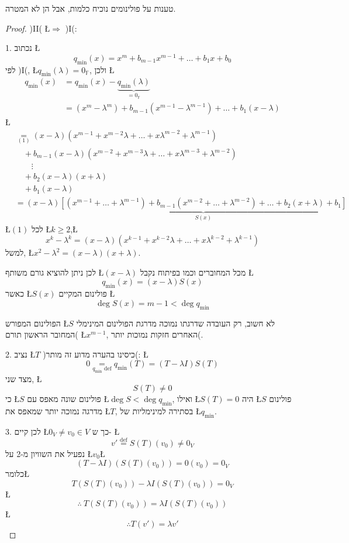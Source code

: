 \documentclass[english,hebrew]{article}
\begin{document}
טענות על פולינומים נוכיח כלמות, אבל הן לא המטרה.
\begin{proof}
)II( \L{$\Rightarrow$} )I(:

1. נכתוב \L{%
\[
q_{\min}(x)=x^{m}+b_{m-1}x^{m-1}+\dots+b_{1}x+b_{0}
\]
}%
לפי )I(, \L{$q_{\min}(\lambda)=0_{\mathbb{F}}$}, ולכן \L{%
\begin{align*}
q_{\min}(x) & =q_{\min}(x)-\underbrace{q_{\min}(\lambda)}_{=0_{\mathbb{F}}}\\
 & =\left(x^{m}-\lambda^{m}\right)+b_{m-1}\left(x^{m-1}-\lambda^{m-1}\right)+\dots+b_{1}\left(x-\lambda\right)
\end{align*}
}%
\L{%
\begin{align*}
 & \underset{(1)}{=}\left(x-\lambda\right)\left(x^{m-1}+x^{m-2}\lambda+\dots+x\lambda^{m-2}+\lambda^{m-1}\right)\\
 & \quad+b_{m-1}\left(x-\lambda\right)\left(x^{m-2}+x^{m-3}\lambda+\dots+x\lambda^{m-3}+\lambda^{m-2}\right)\\
 & \quad\quad\vdots\\
 & \quad+b_{2}\left(x-\lambda\right)\left(x+\lambda\right)\\
 & \quad+b_{1}\left(x-\lambda\right)\\
 & =\left(x-\lambda\right)\underset{S(x)}{\underbrace{\left[\left(x^{m-1}+\dots+\lambda^{m-1}\right)+b_{m-1}\left(x^{m-2}+\dots+\lambda^{m-2}\right)+\dots+b_{2}\left(x+\lambda\right)+b_{1}\right]}}
\end{align*}
}%
\L{$(1)$} לכל \L{$k\geq2$},\L{%
\[
x^{k}-\lambda^{k}=(x-\lambda)\left(x^{k-1}+x^{k-2}\lambda+\dots+x\lambda^{k-2}+\lambda^{k-1}\right)
\]
}%
למשל, \L{$x^{2}-\lambda^{2}=(x-\lambda)(x+\lambda)$}. 

לכן ניתן להוציא גורם משותף \L{$(x-\lambda)$} מכל המחוברים וכמו בפיתוח
נקבל \L{%
\[
q_{\min}(x)=(x-\lambda)S(x)
\]
}%
כאשר \L{$S(x)$} פולינום המקיים \L{%
\[
\deg S(x)=m-1<\deg q_{\min}
\]
}%

הפולינום המפורש \L{$S$} לא חשוב, רק העובדה שדרגתו נמוכה מדרגת הפולינום
המינימלי )המחובר הראשון תורם \L{$x^{m-1}$}, האחרים חזקות נמוכות יותר(.

2. נציב \L{$T$} )כיסינו בהערה מדוע זה מותר(: \L{%
\[
0\underset{q_{\text{min}}\text{ def}}{=}q_{\min}(T)=(T-\lambda I)S(T)
\]
}%
מצד שני, \L{%
\[
S(T)\neq0
\]
}%
כי \L{$S$} פולינום שונה מאפס עם \L{$\deg S<\deg q_{\min}$}, ואילו
\L{$S(T)=0$} היה \L{$S$} פולינום מדרגה נמוכה יותר שמאפס את \L{$T$},
בסתירה למינימליות של \L{$q_{\min}$}.

3. לכן קיים \L{$0_{V}\ne v_{0}\in V$} כך ש- \L{%
\[
v'\overset{\text{def}}{=}S(T)\left(v_{0}\right)\neq0_{V}
\]
}%
נפעיל את השוויון מ-2 על \L{$v_{0}$}\L{%
\[
\left(T-\lambda I\right)\left(S\left(T\right)\left(v_{0}\right)\right)=0\left(v_{0}\right)=0_{V}
\]
}%
כלומר\L{%
\[
T\left(S\left(T\right)\left(v_{0}\right)\right)-\lambda I\left(S\left(T\right)\left(v_{0}\right)\right)=0_{V}
\]
}%
\L{%
\[
\therefore\ T\left(S\left(T\right)\left(v_{0}\right)\right)=\lambda I\left(S\left(T\right)\left(v_{0}\right)\right)
\]
}%
\L{%
\[
\therefore T\left(v'\right)=\lambda v'
\]
}%


\end{proof}
\end{document}
